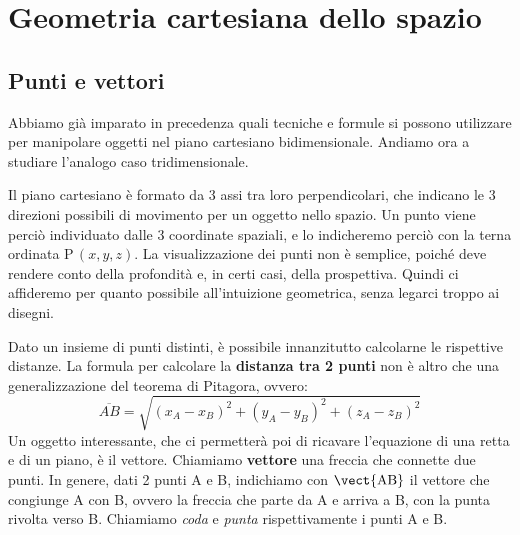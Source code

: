
\newcommand{\vettcol}[3]{\begin{pmatrix}
#1\\ #2\\ #3
\end{pmatrix}}


\chapter{Geometria cartesiana dello spazio}

\section{Punti e vettori}
\label{sec:Punti_e_vettori}

Abbiamo già imparato in precedenza quali tecniche e formule si possono utilizzare per manipolare oggetti nel piano cartesiano bidimensionale. Andiamo ora a studiare l'analogo caso tridimensionale. 

\vspace{7pt}

Il piano cartesiano è formato da 3 assi tra loro perpendicolari, che indicano le 3 direzioni possibili di movimento per un oggetto nello spazio. Un punto viene perciò individuato dalle 3 coordinate spaziali, e lo indicheremo perciò con la terna ordinata P\,\((x,y,z)\). La visualizzazione dei punti non è semplice, poiché deve rendere conto della profondità e, in certi casi, della prospettiva. Quindi ci affideremo per quanto possibile all'intuizione geometrica, senza legarci troppo ai disegni.

\vspace{7pt}

Dato un insieme di punti distinti, è possibile innanzitutto calcolarne le rispettive distanze. La formula per calcolare la \textbf{distanza tra 2 punti} non è altro che una generalizzazione del teorema di Pitagora, ovvero:
\[\overline{AB} = \sqrt{(x_A-x_B)^2+(y_A-y_B)^2+(z_A-z_B)^2}\]
Un oggetto interessante, che ci permetterà poi di ricavare l'equazione di una 
retta e di un piano, è il vettore. Chiamiamo \textbf{vettore} una freccia che 
connette due punti. In genere, dati 2 punti A e B, indichiamo con 
\(\vect{\text{AB}}\) il vettore che congiunge A con B, ovvero la freccia che 
parte da A e arriva a B, con la punta rivolta verso B. Chiamiamo \emph{coda} 
e \emph{punta} rispettivamente i punti A e B. 

\vspace{7pt}


